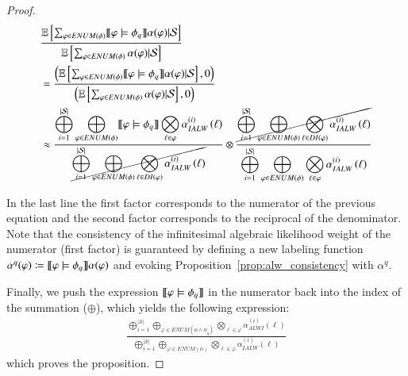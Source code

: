 \begin{proof}
    \begin{align}
         & \frac{
            \operatorname*{\mathbb{E}} \left[ \sum_{\varphi\in ENUM(\phi)   } \llbracket\varphi \models \phi_q\rrbracket \alpha(\varphi) |  \mathcal{S}  \right]
        }
        {
            \operatorname*{\mathbb{E}} \left[ \sum_{\varphi\in ENUM(\phi) } \alpha(\varphi) |  \mathcal{S}   \right]
        }
        \\
         & =
        \frac{
            \left(\operatorname*{\mathbb{E}} \left[ \sum_{\varphi\in ENUM(\phi)   } \llbracket\varphi \models \phi_q\rrbracket \alpha(\varphi) |  \mathcal{S}  \right], 0 \right)
        }
        {
            \left( \operatorname*{\mathbb{E}} \left[ \sum_{\varphi\in ENUM(\phi) } \alpha(\varphi) |  \mathcal{S}   \right],0 \right)
        }          \\
         & \approx
        \frac
        {
        \displaystyle \bigoplus_{i=1}^{\lvert \mathcal{S} \rvert}  \bigoplus_{\varphi\in ENUM(\phi)} \llbracket\varphi \models \phi_q\rrbracket \bigotimes_{\ell \in \varphi}   \alpha_{IALW}^{(i)} \left(\ell \right)}
        {
        \displaystyle  \cancel{ \bigoplus_{i=1}^{\lvert \mathcal{S} \rvert}  \bigoplus_{\varphi\in ENUM(\phi)} \bigotimes_{\ell \in  DI(\varphi)}  \alpha_{IALW}^{(i)} \left(\ell \right) }}
        \otimes
        \frac
        {
        \displaystyle \cancel{\bigoplus_{i=1}^{\lvert \mathcal{S} \rvert}  \bigoplus_{\varphi\in ENUM(\phi)} \bigotimes_{\ell \in  DI(\varphi)}  \alpha_{IALW}^{(i)} \left(\ell \right) } }
        {
        \displaystyle \bigoplus_{i=1}^{\lvert \mathcal{S} \rvert}  \bigoplus_{\varphi\in ENUM(\phi)} \bigotimes_{\ell \in \varphi}  \alpha_{IALW}^{(i)} \left(\ell \right)
        } \label{eq:cond_amc_canel}
    \end{align}

    In the last line the first factor corresponds to the numerator of the previous equation and the second factor corresponds to the reciprocal of the denominator.
    Note that the consistency of the infinitesimal algebraic likelihood weight of the numerator (first factor) is guaranteed by defining a new labeling function $\alpha^q(\varphi)\coloneqq \llbracket\varphi \models \phi_q\rrbracket \alpha(\varphi)$ and evoking Proposition~\ref{prop:alw_consistency} with $\alpha^q$.

    Finally, we push the expression $\llbracket\varphi \models \phi_q\rrbracket$ in the numerator back into the index of the summation ($\oplus$), which yields the following expression:
    \begin{align}
        \frac
        { \bigoplus_{i=1}^{\lvert \mathcal{S} \rvert}  \bigoplus_{\varphi\in ENUM(\phi \land \phi_{q})} \bigotimes_{\ell \in \varphi}  \alpha_{ALWI}^{(i)} \left(\ell \right)}
        { \bigoplus_{i=1}^{\lvert \mathcal{S} \rvert}  \bigoplus_{\varphi\in ENUM(\phi)} \bigotimes_{\ell \in \varphi}  \alpha_{IALW}^{(i)} \left(\ell \right)}
        \label{eq:cond_alw_last}
    \end{align}
    which proves the proposition. \end{proof}





